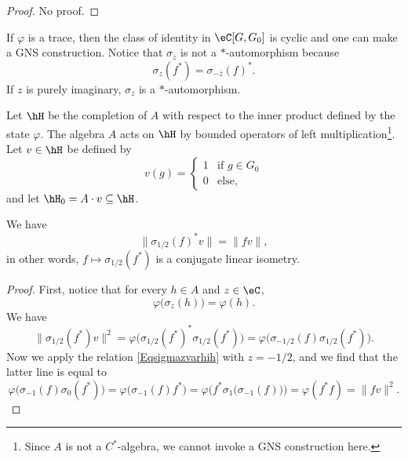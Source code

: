\begin{proof}
No proof.
\end{proof}
If $\varphi$ is a trace, then the class of identity in $\eC[G,G_0]$ is cyclic and one can make a GNS construction. Notice that $\sigma_z$ is not a $*$-automorphism because
\begin{equation}
	\sigma_z(f^*)=\sigma_{-\bar z}(f)^*.
\end{equation}
If $z$ is purely imaginary, $\sigma_z$ is a $*$-automorphism.

Let $\hH$ be the completion of $A$ with respect to the inner product defined by the state $\varphi$. The algebra $A$ acts on $\hH$ by bounded operators of left multiplication\footnote{Since $A$ is not a $C^*$-algebra, we cannot invoke a GNS construction here.}. Let $v\in\hH$ be defined by
\begin{equation}
	v(g)=
\begin{cases}
	1&\text{if }g\in G_0\\
	0&\text{else},
\end{cases}
\end{equation}
and let $\hH_0=A\cdot v\subseteq\hH$.


\begin{lemma}
	We have
	\begin{equation}
		\| \sigma_{1/2}(f)^*v \|=\| fv \|,
	\end{equation}
	in other words, $f\mapsto \sigma_{1/2}(f^*)$ is a conjugate linear isometry.
\end{lemma}

\begin{proof}
	First, notice that for every $h\in A$ and $z\in \eC$,
	\begin{equation}		\label{Eqsigmazvarhih}
		\varphi\big( \sigma_z(h) \big)=\varphi(h).
	\end{equation}
	We have 
	\begin{equation}
		\| \sigma_{1/2}(f^*)v \|^2=\varphi\big( \sigma_{1/2}(f^*)^*\sigma_{1/2}(f^*) \big)=\varphi\big( \sigma_{-1/2}(f)\sigma_{1/2}(f^*) \big).
	\end{equation}
	Now we apply the relation \eqref{Eqsigmazvarhih} with $z=-1/2$, and we find that the latter line is equal to
	\begin{equation}
		\varphi\big( \sigma_{-1}(f)\sigma_0(f^*) \big)=\varphi\big( \sigma_{-1}(f)f^* \big)=\varphi\Big( f^*\sigma_1\big( \sigma_{-1}(f) \big) \Big)=\varphi(f^*f)=\| fv \|^2.
	\end{equation}
\end{proof}

